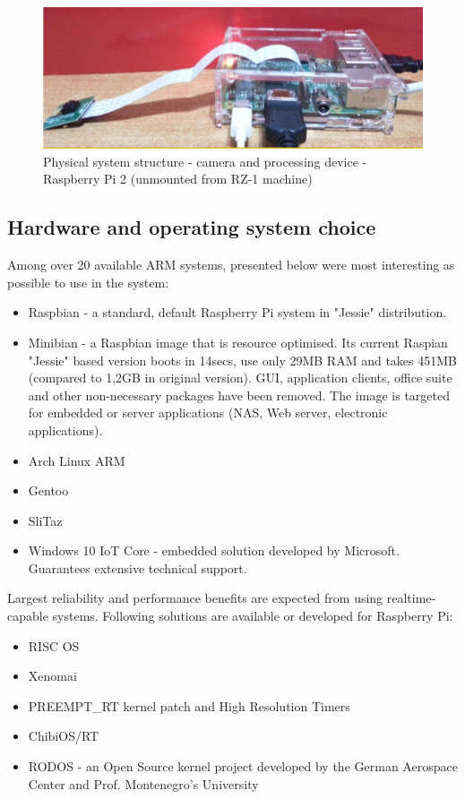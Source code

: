 \documentclass[12pt,twoside,a4paper]{article}
\begin{document}
\begin{figure}[H]
\centering
\includegraphics[width=0.8\paperwidth]{phisical}
\caption{Physical system structure - camera and processing device - Raspberry Pi 2 (unmounted from RZ-1 machine)}\label{fig:phisical}
\end{figure}


\subsection{Hardware and operating system choice}

Among over 20 available ARM systems, presented below were most interesting as possible to use in the system:
\begin{itemize}
  \item Raspbian - a standard, default Raspberry Pi system in "Jessie" distribution.
  \item Minibian - a Raspbian image that is resource optimised.
  Its current Raspian "Jessie" based version boots in 14secs, use only 29MB RAM and takes 451MB (compared to 1,2GB in original version). GUI, application clients, office suite and other non-necessary packages have been removed. The image is targeted for embedded or server applications (NAS, Web server, electronic applications).
  \item Arch Linux ARM
  \item Gentoo
  \item SliTaz
  \item Windows 10 IoT Core - embedded solution developed by Microsoft. Guarantees extensive technical support.
\end{itemize}

Largest reliability and performance benefits are expected from using realtime-capable systems.
Following solutions are available or developed for Raspberry Pi:

\begin{itemize}
  \item RISC OS
  \item Xenomai
  \item PREEMPT\_RT kernel patch and High Resolution Timers\cite{stackos}
  \item ChibiOS/RT\cite{chibi}
  \item RODOS - an Open Source kernel project developed by the German Aerospace Center and Prof. Montenegro's University\cite{rodos}
\end{itemize}
\end{document}
